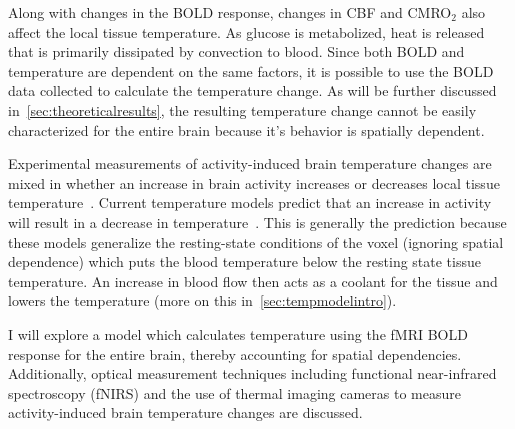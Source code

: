 Along with changes in the BOLD response, changes in CBF and CMRO$_2$ also affect the local tissue temperature.  As glucose is metabolized, heat is released that is primarily dissipated by convection to blood.  Since both BOLD and temperature are dependent on the same factors, it is possible to use the BOLD data collected to calculate the temperature change.  As will be further discussed in~\cref{sec:theoreticalresults}, the resulting temperature change cannot be easily characterized for the entire brain because it's behavior is spatially dependent.

Experimental measurements of activity-induced brain temperature changes are mixed in whether an increase in brain activity increases or decreases local tissue temperature~\citep{mcelligott,kiyatkin,zeschke,george,tachibana}. Current temperature models predict that an increase in activity will result in a decrease in temperature~\citep{sotero2011,yablonskiy,trubel}.  This is generally the prediction because these models generalize the resting-state conditions of the voxel (ignoring spatial dependence) which puts the blood temperature below the resting state tissue temperature.  An increase in blood flow then acts as a coolant for the tissue and lowers the temperature (more on this in~\cref{sec:tempmodelintro}).

I will explore a model which calculates temperature using the fMRI BOLD response for the entire brain, thereby accounting for spatial dependencies.  Additionally, optical measurement techniques including functional near-infrared spectroscopy (fNIRS) and the use of thermal imaging cameras to measure activity-induced brain temperature changes are discussed.